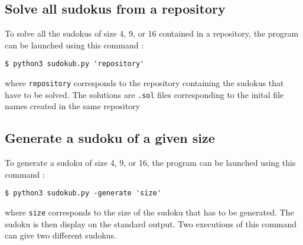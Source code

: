 \documentclass[a4paper, 11pt, oneside]{article}
\begin{document}
\subsection{Solve all sudokus from a repository}

To solve all the sudokus of size 4, 9, or 16 contained in a repository, the program can be launched using this command : 
\begin{lstlisting}
$ python3 sudokub.py 'repository'
\end{lstlisting}
where \texttt{repository} corresponds to the repository containing the sudokus that have to be solved. The solutions are \texttt{.sol} files corresponding to the inital file names created in the same repository

\subsection{Generate a sudoku of a given size}

To generate a sudoku of size 4, 9, or 16, the program can be launched using this command : 
\begin{lstlisting}
$ python3 sudokub.py -generate 'size'
\end{lstlisting}
where \texttt{size} corresponds to the size of the sudoku that has to be generated. The sudoku is then display on the standard output. Two executions of this command can give two different sudokus.

\end{document}
